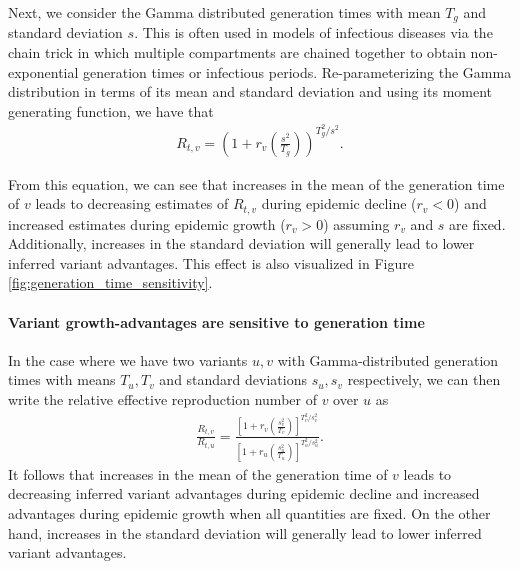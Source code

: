 \documentclass[11pt,oneside,letterpaper]{article}
\begin{document}
Next, we consider the Gamma distributed generation times with mean $T_{g}$ and standard deviation $s$.
This is often used in models of infectious diseases via the chain trick in which multiple compartments are chained together to obtain non-exponential generation times or infectious periods.
Re-parameterizing the Gamma distribution in terms of its mean and standard deviation and using its moment generating function, we have that
\begin{align*}
R_{t,v} = \left(1 + r_{v}  \left(\frac{s^{2}}{T_{g}}\right) \right)^{T_{g}^{2} / s^{2}}.
\end{align*}

From this equation, we can see that increases in the mean of the generation time of $v$ leads to decreasing estimates of $R_{t,v}$ during epidemic decline ($r_{v} < 0$) and increased estimates during epidemic growth ($r_{v} > 0$) assuming $r_{v}$ and $s$ are fixed.
Additionally, increases in the standard deviation will generally lead to lower inferred variant advantages.
This effect is also visualized in Figure \ref{fig:generation_time_sensitivity}.

\paragraph{Variant growth-advantages are sensitive to generation time}%

In the case where we have two variants $u, v$ with Gamma-distributed generation times with means $T_{u}, T_{v}$ and standard deviations $s_{u}, s_{v}$ respectively, we can then write the relative effective reproduction number of $v$ over $u$ as
\begin{align*}
\frac{R_{t,v}}{R_{t,u}} = \frac{\left[1 + r_{v}  \left(\frac{s_{v}^{2}}{T_{v}}\right)\right]^{T_{v}^{2} / s_{v}^{2}}}{\left[1 + r_{u} \left(\frac{s_{u}^{2}}{T_{u}}\right)\right]^{T_{u}^{2} / s_{u}^{2}}}.
\end{align*}
It follows that increases in the mean of the generation time of $v$ leads to decreasing inferred variant advantages during epidemic decline and increased advantages during epidemic growth when all quantities are fixed.
On the other hand, increases in the standard deviation will generally lead to lower inferred variant advantages. 
\end{document}
